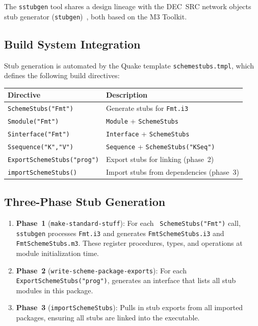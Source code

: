 \documentclass[12pt]{report}
\begin{document}
The {\tt sstubgen} tool shares a design lineage with the DEC~SRC
network objects stub generator ({\tt stubgen})~\cite{netobj}, both
based on the M3 Toolkit.

\subsection{Build System Integration}

Stub generation is automated by the Quake template
{\tt schemestubs.tmpl}, which defines the following build directives:

\begin{center}
\begin{tabular}{ll}
\toprule
\textbf{Directive} & \textbf{Description} \\
\midrule
{\tt SchemeStubs("Fmt")}           & Generate stubs for {\tt Fmt.i3} \\
{\tt Smodule("Fmt")}               & {\tt Module} + {\tt SchemeStubs} \\
{\tt Sinterface("Fmt")}            & {\tt Interface} + {\tt SchemeStubs} \\
{\tt Ssequence("K","V")}           & {\tt Sequence} + {\tt SchemeStubs("KSeq")} \\
{\tt ExportSchemeStubs("prog")}    & Export stubs for linking (phase~2) \\
{\tt importSchemeStubs()}          & Import stubs from dependencies (phase~3) \\
\bottomrule
\end{tabular}
\end{center}

\subsection{Three-Phase Stub Generation}

\begin{enumerate}
\item \textbf{Phase~1} ({\tt make-standard-stuff}): For each {\tt
  SchemeStubs("Fmt")} call, {\tt sstubgen} processes {\tt Fmt.i3} and
  generates {\tt FmtSchemeStubs.i3} and {\tt FmtSchemeStubs.m3}.
  These register procedures, types, and operations at module
  initialization time.

\item \textbf{Phase~2} ({\tt write-scheme-package-exports}): For each
  {\tt ExportSchemeStubs("prog")}, generates an interface that lists
  all stub modules in this package.

\item \textbf{Phase~3} ({\tt importSchemeStubs}): Pulls in stub
  exports from all imported packages, ensuring all stubs are linked
  into the executable.
\end{enumerate}
\end{document}
